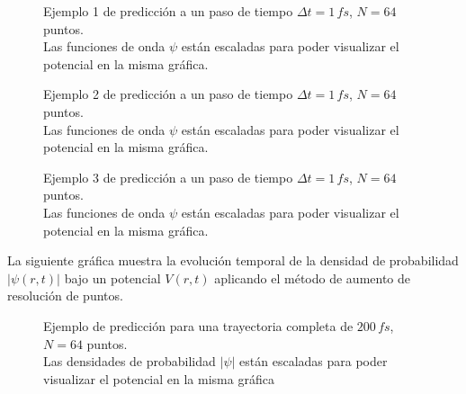 \begin{figure}[H]
  \centering
  \caption{Ejemplo 1 de predicción a un paso de tiempo $\Delta t = 1\,fs$, $N=64$ puntos.\\ Las funciones de onda $\psi$ están escaladas para poder visualizar el potencial en la misma gráfica.}
  \label{fig:1step164}
\end{figure}

\begin{figure}[H]
  \centering
  \caption{Ejemplo 2 de predicción a un paso de tiempo $\Delta t = 1\,fs$, $N=64$ puntos.\\ Las funciones de onda $\psi$ están escaladas para poder visualizar el potencial en la misma gráfica.}
  \label{fig:1step264}
\end{figure}

\begin{figure}[H]
  \centering
  \caption{Ejemplo 3 de predicción a un paso de tiempo $\Delta t = 1\,fs$, $N=64$ puntos.\\ Las funciones de onda $\psi$ están escaladas para poder visualizar el potencial en la misma gráfica.}
  \label{fig:1step364}
\end{figure}

La siguiente gráfica muestra la evolución temporal de la densidad de probabilidad $|\psi(r,t)|$ bajo un potencial $V(r,t)$ aplicando el método de aumento de resolución de puntos.

\begin{figure}[H]
  \centering
  \caption{Ejemplo de predicción para una trayectoria completa de $200\,fs$, $N=64$ puntos.\\ Las densidades de probabilidad $|\psi|$ están escaladas para poder visualizar el potencial en la misma gráfica}
  \label{fig:trajec1_64}
\end{figure}

